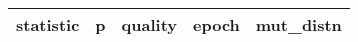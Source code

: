 \vspace{-10pt}
\begin{longtable}{||c c c c c||}\small
    \centering
     statistic & p & quality & epoch & mut\_distn \\  [0.5ex]
     \hline

\end{longtable}
